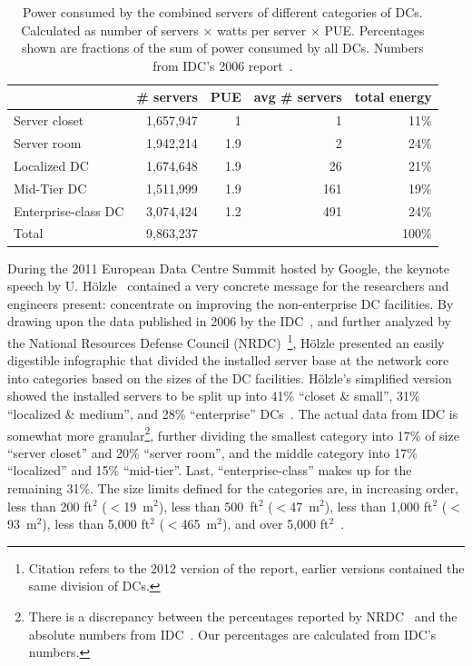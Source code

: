 \documentclass[officiallayout]{tktla}
\begin{document}
\begin{table}
  \centering
  \begin{tabular}{l|r|r|r|r} \hline
 & \# servers & PUE & avg \# servers & total energy \\
 \hline
Server closet & 1,657,947 & 1 & 1 & 11\% \\
Server room & 1,942,214 & 1.9 & 2 & 24\% \\
Localized DC & 1,674,648 & 1.9 & 26 & 21\% \\
Mid-Tier DC & 1,511,999 & 1.9 & 161 & 19\% \\
Enterprise-class DC & 3,074,424 & 1.2 & 491 & 24\% \\
 \hline
Total & 9,863,237 & & & 100\% \\
  \end{tabular}
  \caption{Power consumed by the combined servers of different categories of
  DCs. Calculated as number of servers $\times$ watts per server $\times$ PUE.
  Percentages shown are fractions of the sum of power consumed by all DCs.
  Numbers from IDC's 2006 report~\cite{Bailey2006}.}
  \label{tab:closets}
\end{table}

During the 2011 European Data Centre Summit hosted by Google, the keynote
speech by U. Hölzle~\cite{Holzle2011} contained a very concrete message for
the researchers and engineers present: concentrate on improving the
non-enterprise DC facilities. By drawing upon the data published in 2006 by
the IDC~\cite{Bailey2006}, and further analyzed by the National Resources
Defense Council (NRDC)~\cite{Bramfitt2012}\footnote{Citation refers to the
2012 version of the report, earlier versions contained the same division of
DCs.}, Hölzle presented an easily digestible infographic that divided the
installed server base at the network core into categories based on the sizes
of the DC facilities. Hölzle's simplified version showed the installed servers
to be split up into 41\% ``closet \& small'', 31\% ``localized \& medium'',
and 28\% ``enterprise'' DCs~\cite{Holzle2011,Bramfitt2012}. The actual data
from IDC is somewhat more granular\footnote{There is a discrepancy between the
percentages reported by NRDC~\cite{Bramfitt2012} and the absolute numbers from
IDC~\cite{Bailey2006}. Our percentages are calculated from IDC's numbers.},
further dividing the smallest category into 17\% of size ``server closet'' and
20\% ``server room'', and the middle category into 17\% ``localized'' and 15\%
``mid-tier''.  Last, ``enterprise-class'' makes up for the remaining 31\%. The
size limits defined for the categories are, in increasing order, less than 200
ft$^2$ ($<$19~m$^2$), less than 500~ft$^2$ ($<$47~m$^2$), less than 1,000
ft$^2$ ($<$93~m$^2$), less than 5,000 ft$^2$ ($<$465~m$^2$), and over 5,000
ft$^2$~\cite{Bailey2006,Bramfitt2012}.
\end{document}
